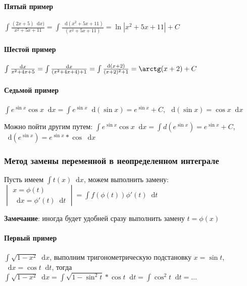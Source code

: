 \documentclass{article}
\newcommand*\diff{\mathop{}\!\mathrm{d}}
\begin{document}
\paragraph{Пятый пример}

$\int \frac{(2 x + 5) \diff x)}{x^2 + 5 x + 11} = \int \frac{\diff (x^2 + 5x + 11)}{(x^2 + 5x + 11)} = \ln |x^2 + 5x + 11| + C$

\paragraph{Шестой пример}

$\int \frac{\diff x}{x^2 + 4x + 5} = \int \frac{\diff x}{(x^2 + 4x + 4) + 1} = \int \frac{\diff (x + 2)}{(x + 2)^2 + 1} = \arctg (x + 2) + C$

\paragraph{Седьмой пример}

$\int e^{\sin x} \cos x \diff x = \int e^{\sin x} \diff (\sin x) = e^{\sin x} + C$, $\diff (\sin x) = \cos x \diff x$

Можно пойти другим путем: $\int e^{\sin x} \cos x \diff x = \int d (e^{\sin x}) = e^{\sin x} + C$, $\diff (e^{\sin x}) = e^{\sin x} * \cos \diff x$

\subsubsection{Метод замены переменной в неопределенном интеграле}

Пусть имеем $\int t(x) \diff x$, можем выполнить замену: $\begin{vmatrix}
    x = \phi (t) \\
    \diff x = \phi'(t) \diff t
\end{vmatrix} = \int f(\phi(t)) \phi'(t) \diff t$

\textbf{Замечание}: иногда будет удобней сразу выполнить замену $t = \phi(x)$

\hfill

\paragraph{Первый пример}

$\int \sqrt{1 - x^2} \diff x$, выполним тригонометрическую подстановку $x = \sin t$, $\diff x = \cos t \diff t$, тогда $\int \sqrt{1 - x^2} \diff x = \int \sqrt{1 - \sin^2 t} * \cos t \diff t = \int \cos^2 t \diff t = \dots$ 
\end{document}
